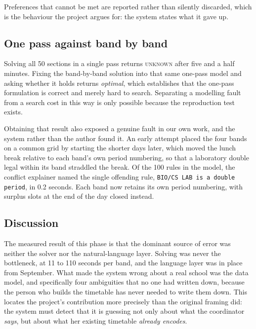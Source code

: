 Preferences that cannot be met are reported rather than silently discarded, which is the
behaviour the project argues for: the system states what it gave up.

\subsection{One pass against band by band}

Solving all 50 sections in a single pass returns \textsc{unknown} after five and a half minutes.
Fixing the band-by-band solution into that same one-pass model and asking whether it holds returns
\emph{optimal}, which establishes that the one-pass formulation is correct and merely hard to
search. Separating a modelling fault from a search cost in this way is only possible because the
reproduction test exists.

Obtaining that result also exposed a genuine fault in our own work, and the system rather than the
author found it. An early attempt placed the four bands on a common grid by starting the shorter
days later, which moved the lunch break relative to each band's own period numbering, so that a
laboratory double legal within its band straddled the break. Of the 100 rules in the model, the
conflict explainer named the single offending rule, \texttt{BIO/CS LAB is a double period}, in
0.2 seconds. Each band now retains its own period numbering, with surplus slots at the end of the
day closed instead.

\subsection{Discussion}

The measured result of this phase is that the dominant source of error was neither the solver nor
the natural-language layer. Solving was never the bottleneck, at 11 to 110 seconds per band, and
the language layer was in place from September. What made the system wrong about a real school was
the data model, and specifically four ambiguities that no one had written down, because the person
who builds the timetable has never needed to write them down. This locates the project's
contribution more precisely than the original framing did: the system must detect that it is
guessing not only about what the coordinator \emph{says}, but about what her existing timetable
\emph{already encodes}.
